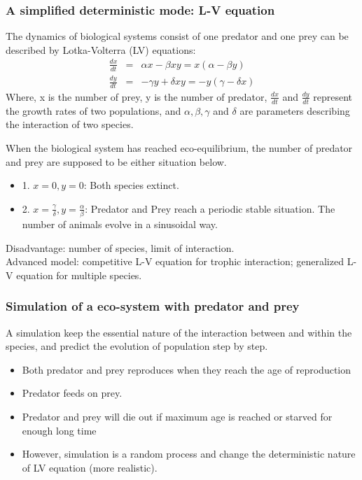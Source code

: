 \documentclass{beamer}
\begin{document}
\frame
{
 	\frametitle{A simplified deterministic mode: L-V equation}
 	The dynamics of biological systems consist of one predator and one prey can be described by Lotka-Volterra (LV) equations:
 	\begin{eqnarray*}
 	\frac{dx}{dt} &=& \alpha x - \beta x y = x(\alpha - \beta y) \\
 	\frac{dy}{dt} &=& - \gamma y + \delta x y = - y (\gamma - \delta x)
 	\end{eqnarray*}
    Where, x is the number of prey, y is the number of predator, $\frac{dx}{dt}$ and $\frac{dy}{dt}$ represent the growth rates of two populations, and $\alpha, \beta, \gamma$ and $\delta$ are parameters describing the interaction of two species. \\
}
\frame
{
 	When the biological system has reached eco-equilibrium, the number of predator and prey are supposed to be either situation below.
    \begin{itemize}
    \item 1. $x = 0, y = 0$: Both species extinct. 
    \item 2. $x = \frac{\gamma}{\delta}, y = \frac{\alpha}{\beta}$: Predator and Prey reach a periodic stable situation. The number of animals evolve in a sinusoidal way.
    \end{itemize}
    \medskip \medskip
 	Disadvantage: number of species, limit of interaction. \\
    Advanced model: competitive L-V equation for trophic interaction; generalized L-V equation for multiple species.
}


\frame
{
  \frametitle{Simulation of a eco-system with predator and prey}
  A simulation keep the essential nature of the interaction between and within the species, and predict the evolution of population step by step.
  \begin{itemize}
  \item<1->{Both predator and prey reproduces when they reach the age of reproduction}
  \item<2->{Predator feeds on prey.}
  \item<3->{Predator and prey will die out if maximum age is reached or starved for enough long time}
  \item<4->{However, simulation is a random process and change the deterministic nature of LV equation (more realistic).}
  \end{itemize} 
}
\end{document}

